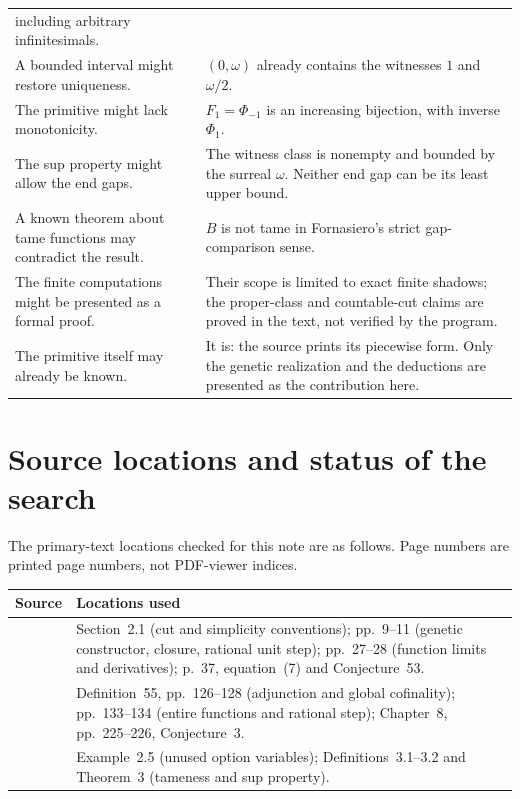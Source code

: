 \documentclass[11pt,letterpaper]{article}
\numberwithin{equation}{section}
\theoremstyle{definition}
\theoremstyle{remark}
\begin{document}
\begin{longtable}{@{}p{}p{}@{}}
 including arbitrary infinitesimals.\\[0.5em]
A bounded interval might restore uniqueness.
 & $(0,\omega)$ already contains the witnesses $1$ and $\omega/2$.\\[0.5em]
The primitive might lack monotonicity.
 & $F_1=\Phi_{-1}$ is an increasing bijection, with inverse $\Phi_1$.\\[0.5em]
The sup property might allow the end gaps.
 & The witness class is nonempty and bounded by the surreal $\omega$.
 Neither end gap can be its least upper bound.\\[0.5em]
A known theorem about tame functions may contradict the result.
 & $B$ is not tame in Fornasiero's strict gap-comparison sense.\\[0.5em]
The finite computations might be presented as a formal proof.
 & Their scope is limited to exact finite shadows; the proper-class and
 countable-cut claims are proved in the text, not verified by the program.\\[0.5em]
The primitive itself may already be known.
 & It is: the source prints its piecewise form. Only the genetic
 realization and the deductions are presented as the contribution here.\\
\bottomrule
\end{longtable}

\section{Source locations and status of the search}\label{app:sources}
The primary-text locations checked for this note are as follows. Page
numbers are printed page numbers, not PDF-viewer indices.
\begin{center}
\small
\begin{tabularx}{\textwidth}{@{}lX@{}}
\toprule
Source & Locations used\\
\midrule
\cite{RSS} & Section~2.1 (cut and simplicity conventions);
 pp.~9--11 (genetic constructor, closure, rational unit step);
 pp.~27--28 (function limits and derivatives);
 p.~37, equation~(7) and Conjecture~53.\\[0.4em]
\cite{Berenbeim} & Definition~55, pp.~126--128 (adjunction and global
 cofinality); pp.~133--134 (entire functions and rational step);
 Chapter~8, pp.~225--226, Conjecture~3.\\[0.4em]
\cite{Fornasiero} & Example~2.5 (unused option variables);
 Definitions~3.1--3.2 and Theorem~3 (tameness and sup property).\\
\bottomrule
\end{tabularx}
\end{center}
\end{document}
